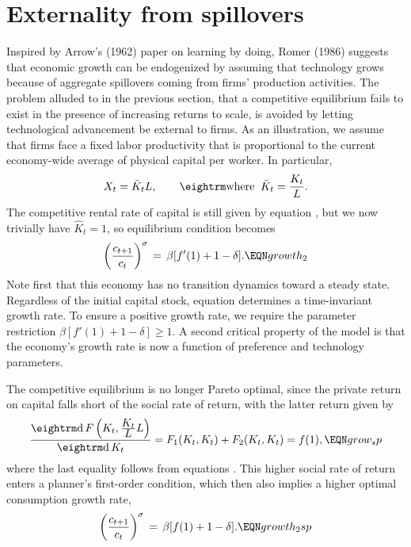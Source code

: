\section{Externality from spillovers}

Inspired by Arrow's (1962)
%
paper on learning by doing, Romer (1986)
%
suggests that economic growth can be endogenized by assuming that
technology grows because of aggregate spillovers coming from
firms' production activities. The
problem alluded to in the previous section, that a competitive
equilibrium fails to exist in the presence of increasing returns
to scale, is avoided by letting technological advancement be
external to firms.
As an illustration, we assume that firms
face a fixed  labor productivity that is proportional to the current
economy-wide average of physical capital per worker.
In particular,
$$
X_t = \bar K_t L, \qquad {\rm where}\;\; \bar K_{t} = {K_t \over L}.
$$
The competitive rental rate of capital is still given by equation
 ,
but we now trivially have $\hat K_t=1$, so equilibrium condition 
becomes
$$
\left({c_{t+1} \over c_t}\right)^\sigma \,=\, \beta [f'(1) +1 - \delta].
                                                            \EQN growth_2
$$
Note first that this economy has no transition
dynamics toward a steady state. Regardless of the initial capital stock,
equation  determines a time-invariant growth rate. To
ensure a positive growth rate, we require the parameter restriction
$\beta [f'(1) +1 - \delta]\geq 1$. A second critical property of the
model is that the economy's growth rate
is now a function of preference and technology parameters.

The competitive equilibrium is no  longer Pareto optimal, since the
private return on capital falls short of the social rate of return,
with the latter return given by
$$
{{\rm d}\, F\left(K_t, {\displaystyle K_t \over \displaystyle L} L \right)
                          \over {\rm d}\, K_t}
= F_1(K_t,K_t) + F_2(K_t,K_t) = f(1),                      \EQN grow_sp
$$
where the last equality follows from equations
 . This higher social rate of
return enters a planner's first-order condition, which then
also implies a higher optimal consumption growth rate,
$$
\left({c_{t+1} \over c_t}\right)^\sigma \,=\, \beta [f(1) +1 - \delta].
                                                            \EQN growth_2sp
$$


